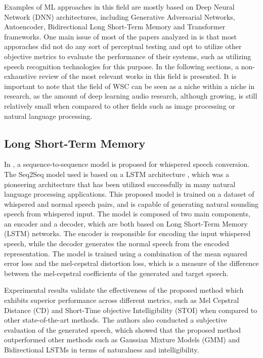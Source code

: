 Examples of ML approaches in this field are mostly based on Deep Neural Network (DNN) architectures, including Generative Adversarial Networks, Autoencoder, Bidirectional Long Short-Term Memory and Transformer frameworks. One main issue of most of the papers analyzed in \cite{oliveiraMachineLearningApproaches2022} is that most apporaches did not do any sort of perceptual testing and opt to utilize other objective metrics to evaluate the performance of their systems, such as utilizing speech recognition technologies for this purpose. In the following sections, a non-exhaustive review of the most relevant works in this field is presented. It is important to note that the field of WSC can be seen as a niche within a niche in research, as the amount of deep learning audio research, although growing, is still relatively small when compared to other fields such as image processing or natural language processing.

\subsection{Long Short-Term Memory}

In \cite{lianWhisperNormalSpeech2019}, a sequence-to-sequence model is proposed for whispered speech conversion. The Seq2Seq model used is based on a LSTM architecture \cite{cho2014learningphraserepresentationsusing}, which was a pioneering architecture that has been utilized successfully in many natural language processing applications. This proposed model is trained on a dataset of whispered and normal speech pairs, and is capable of generating natural sounding speech from whispered input. The model is composed of two main components, an encoder and a decoder, which are both based on Long Short-Term Memory (LSTM) networks. The encoder is responsible for encoding the input whispered speech, while the decoder generates the normal speech from the encoded representation. The model is trained using a combination of the mean squared error loss and the mel-cepstral distortion loss, which is a measure of the difference between the mel-cepstral coefficients of the generated and target speech.

Experimental results validate the effectiveness of the proposed method which exhibits superior performance across different metrics, such as Mel Cepstral Distance (CD) and Short-Time objective Intelligibility (STOI) when compared to other state-of-the-art methods. The authors also conducted a subjective evaluation of the generated speech, which showed that the proposed method outperformed other methods such as Gaussian Mixture Models (GMM) and Bidirectional LSTMs \cite{todaNAMtospeechConversionGaussian2005, meenakshiWhisperedSpeechNeutral2018} in terms of naturalness and intelligibility.

